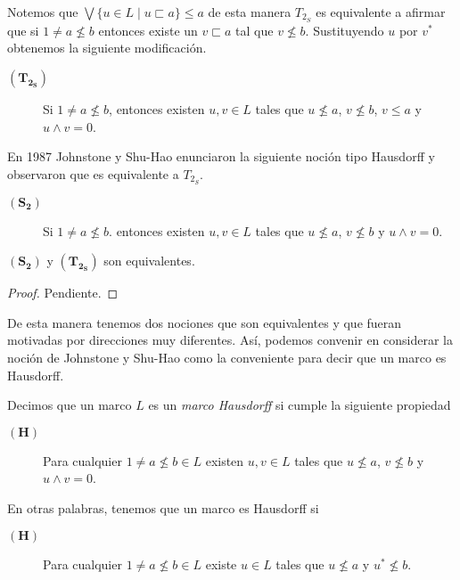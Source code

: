 Notemos que $\bigvee\{u\in L\mid u\sqsubset a\}\leq a$ de esta manera $T_{2_S}$ es equivalente a afirmar que si $1\neq a\nleq b$ entonces existe un $v\sqsubset a$ tal que $v\nleq b$. Sustituyendo $u$ por $v^*$ obtenemos la siguiente modificación.

\begin{description}
    \item[$\mathbf{(T_{2_S})}$] Si $1\neq a\nleq b$, entonces existen $u, v\in L$ tales que $u\nleq a$, $v\nleq b$, $v\leq a$ y $u\wedge v=0$. 
\end{description}

En 1987 Johnstone y Shu-Hao enunciaron la siguiente noción tipo Hausdorff y observaron que es equivalente a $T_{2_S}$.

\begin{description}
    \item[$\mathbf{(S_2)}$] Si $1\neq a\nleq b$. entonces existen $u, v\in L$ tales que $u\nleq a$, $v\nleq b$ y $u\wedge v=0$. 
\end{description}

\begin{prop}\label{Proposicion3.3.1}
    $\mathbf{(S_2)}$ y $\mathbf{(T_{2_S})}$ son equivalentes.
\end{prop}

\begin{proof}
    Pendiente.
\end{proof}

De esta manera tenemos dos nociones que son equivalentes y que fueran motivadas por direcciones muy diferentes. Así, podemos convenir en considerar la noción de Johnstone y Shu-Hao como la conveniente para decir que un marco es Hausdorff.

\begin{dfn}\label{MarcoHausdorff}
    Decimos que un marco $L$ es un \emph{marco Hausdorff} si cumple la siguiente propiedad
    \begin{description}
        \item[$\mathbf{(H)}$] Para cualquier $1\neq a\nleq b\in L$ existen $u, v\in L$ tales que $u\nleq a$, $v\nleq b$ y $u\wedge v=0$. 
    \end{description}
\end{dfn}
En otras palabras, tenemos que un marco es Hausdorff si
\begin{description}
    \item[$\mathbf{(H)}$]  Para cualquier $1\neq a\nleq b\in L$ existe $u\in L$ tales que $u\nleq a$ y $u^*\nleq b$. 
\end{description}

